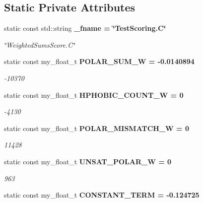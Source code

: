 \subsection*{Static Private Attributes}
\begin{CompactItemize}
\item 
static const std::string \bf{\_\-fname} = \char`\"{}Test\-Scoring.C\char`\"{}\label{classASCbase_1_1TestScoring_b4ebe268b1b74f5fe669c109de103c8f}

\begin{CompactList}\small\item\em \char`\"{}Weighted\-Sums\-Score.C\char`\"{} \item\end{CompactList}\item 
static const my\_\-float\_\-t \bf{POLAR\_\-SUM\_\-W} = -0.0140894\label{classASCbase_1_1TestScoring_d98e1f35e2bdf736d103e6e5b0acb5dd}

\begin{CompactList}\small\item\em -10370 \item\end{CompactList}\item 
static const my\_\-float\_\-t \bf{HPHOBIC\_\-COUNT\_\-W} = 0\label{classASCbase_1_1TestScoring_4d97cb87f8816169344f99d6d82f9910}

\begin{CompactList}\small\item\em -4130 \item\end{CompactList}\item 
static const my\_\-float\_\-t \bf{POLAR\_\-MISMATCH\_\-W} = 0\label{classASCbase_1_1TestScoring_346e2d0eab2f073e92340f747237e674}

\begin{CompactList}\small\item\em 11428 \item\end{CompactList}\item 
static const my\_\-float\_\-t \bf{UNSAT\_\-POLAR\_\-W} = 0\label{classASCbase_1_1TestScoring_668c7fb952beb31eb9c991e0f736570c}

\begin{CompactList}\small\item\em 963 \item\end{CompactList}\item 
static const my\_\-float\_\-t \bf{CONSTANT\_\-TERM} = -0.124725\label{classASCbase_1_1TestScoring_1ee5151bf6450adf872d86f51b9f9e72}


\end{CompactItemize}
